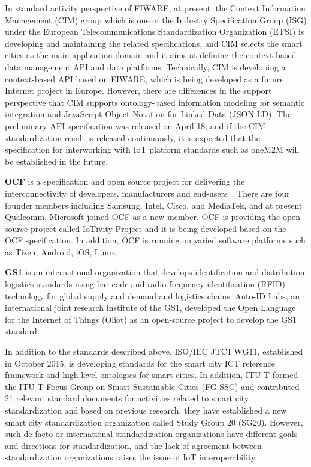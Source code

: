 In standard activity perspective of FIWARE, at present, the Context Information Management (CIM) group which is one of the Industry Specification Group (ISG) under the European Telecommunications Standardization Organization (ETSI) is developing and maintaining the related specifications, and CIM selects the smart cities as the main application domain and it aims at defining the context-based data management API and data platforms. Technically, CIM is developing a context-based API based on FIWARE, which is being developed as a future Internet project in Europe. However, there are differences in the support perspective that CIM supports ontology-based information modeling for semantic integration and JavaScript Object Notation for Linked Data (JSON-LD). The preliminary API specification was released on April 18, and if the CIM standardization result is released continuously, it is expected that the specification for interworking with IoT platform standards such as oneM2M will be established in the future.

\textbf{OCF} is a specification and open source project for delivering the interconnectivity of developers, manufacturers and end-users~\cite{park2017ocf}. There are four founder members including Samsung, Intel, Cisco, and MediaTek, and at present Qualcomm, Microsoft joined OCF as a new member. OCF is providing the open-source project called IoTivity Project and it is being developed based on the OCF specification. In addition, OCF is running on varied software platforms such as Tizen, Android, iOS, Linux.

\textbf{GS1} is an international organization that develops identification and distribution logistics standards using bar code and radio frequency identification (RFID) technology for global supply and demand and logistics chains. Auto-ID Labs, an international joint research institute of the GS1, developed the Open Language for the Internet of Things (Oliot) as an open-source project to develop the GS1 standard.

In addition to the standards described above, ISO/IEC JTC1 WG11, established in October 2015, is developing standards for the smart city ICT reference framework and high-level ontologies for smart cities. In addition, ITU-T formed the ITU-T Focus Group on Smart Sustainable Cities (FG-SSC) and contributed  21 relevant standard documents for activities related to smart city standardization and based on previous research, they have established a new smart city standardization organization called Study Group 20 (SG20). However, such de facto or international standardization organizations have different goals and directions for standardization, and the lack of agreement between standardization organizations raises the issue of IoT interoperability.


